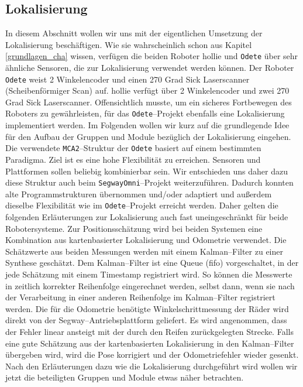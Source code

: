 \subsection{Lokalisierung} 
In diesem Abschnitt wollen wir uns mit der eigentlichen Umsetzung der
 Lokalisierung beschäftigen. Wie sie wahrscheinlich schon aus Kapitel
 \ref{grundlagen_cha} wissen, verfügen die beiden Roboter \gls{hollie} und
 \lstinline{Odete} über sehr ähnliche Sensoren, die zur Lokalisierung verwendet
 werden können. Der Roboter \lstinline{Odete} weist 2 Winkelencoder und einen 270 Grad Sick
 Laserscanner (Scheibenförmiger Scan) auf.
 \gls{hollie} verfügt über 2 Winkelencoder und zwei
 270 Grad Sick Laserscanner.
 Offensichtlich musste, um ein sicheres Fortbewegen des Roboters zu
 gewährleisten, für das \lstinline{Odete}--Projekt ebenfalls eine Lokalisierung implementiert werden.
 Im Folgenden wollen wir kurz auf die grundlegende Idee für den Aufbau der
 Gruppen und Module bezüglich der Lokalisierung eingehen.
 Die verwendete \lstinline{MCA2}--Struktur der \lstinline{Odete} basiert auf
 einem bestimmten Paradigma.
 Ziel ist es eine hohe Flexibilität zu erreichen. Sensoren und Plattformen sollen
 beliebig kombinierbar sein. Wir entschieden uns daher dazu diese Struktur auch
 beim \lstinline{SegwayOmni}--Projekt weiterzuführen. Dadurch konnten alte
 Programmstrukturen übernommen und/oder adaptiert und außerdem dieselbe
 Flexibilität wie im \lstinline{Odete}--Projekt erreicht werden. Daher gelten die folgenden Erläuterungen
 zur Lokalisierung auch fast uneingeschränkt für beide Robotersysteme.
 Zur Positionsschätzung wird bei beiden Systemen eine Kombination aus
 kartenbasierter Lokalisierung und Odometrie verwendet. Die Schätzwerte aus beiden Messungen werden mit einem Kalman--Filter zu einer
 Synthese geschätzt. Dem Kalman--Filter ist eine Queue (\gls{fifo}) vorgeschaltet, in der jede Schätzung
 mit einem Timestamp registriert wird. So können die Messwerte in zeitlich korrekter Reihenfolge
 eingerechnet werden, selbst dann, wenn sie nach der Verarbeitung in einer anderen Reihenfolge
 im Kalman--Filter registriert werden. Die für die Odometrie benötigte Winkelschrittmessung der Räder wird direkt
 von der Segway--Antriebsplattform geliefert.
 Es wird angenommen, dass der Fehler linear ansteigt mit der durch den Reifen zurückgelegten Strecke.
 Falls eine gute Schätzung aus der kartenbasierten Lokalisierung in den Kalman--Filter übergeben wird,
 wird die Pose korrigiert und der Odometriefehler wieder gesenkt.
 Nach den Erläuterungen dazu wie die Lokalisierung durchgeführt wird wollen wir
 jetzt die beteiligten Gruppen und Module etwas näher betrachten. 

